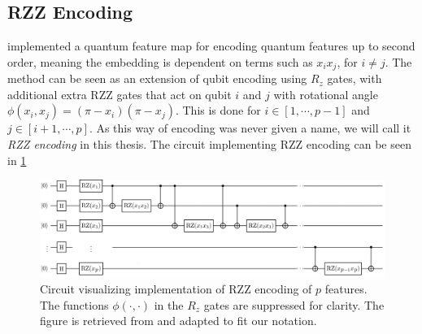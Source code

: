 



\subsection{RZZ Encoding}\label{sec:RZZencoding}
\citet{abbas2020power} implemented a quantum feature map for encoding quantum features up to second order, meaning the embedding is dependent on terms such as $x_i x_j$, for $i\neq j$. The method can be seen as an extension of qubit encoding using $R_z$ gates, with additional extra RZZ gates that act on qubit $i$ and $j$ with rotational angle $\phi(x_i, x_j) = (\pi - x_i)(\pi - x_j)$. This is done for $i\in [1, \cdots, p-1]$ and $j\in [i+1, \cdots, p]$. As this way of encoding was never given a name, we will call it \emph{RZZ encoding} in this thesis. The circuit implementing RZZ encoding can be seen in \cref{fig:Rzzencoding}

\begin{figure}[H]
    \centering
    \includegraphics[width=14cm]{latex/figures/Rzz_encoding.png}
    \caption{Circuit visualizing implementation of RZZ encoding of $p$ features. The functions $\phi(\cdot,\cdot)$ in the $R_z$ gates are suppressed for clarity. The figure is retrieved from \cite{abbas2020power} and adapted to fit our notation.}
    \label{fig:Rzzencoding}
\end{figure}

